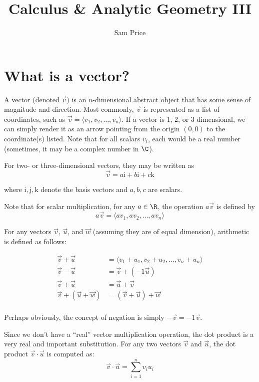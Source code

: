 \documentclass{article}
\title{Calculus \& Analytic Geometry III}
\author{Sam Price}
\begin{document}
\maketitle

\section{What is a vector?}
A vector (denoted $\vec{v}$) is an $n$-dimensional abstract object that has some sense of magnitude and direction.
Most commonly, $\vec{v}$ is represented as a list of coordinates, such as $\vec{v} = \langle v_{1}, v_{2}, \ldots, v_{n} \rangle$.
If a vector is 1, 2, or 3 dimensional, we can simply render it as an arrow pointing from the origin $(0, 0)$ to the coordinate(s) listed.
Note that for all scalars $v_{i}$, each would be a real number (sometimes, it may be a complex number in $\C$).

For two- or three-dimensional vectors, they may be written as
\begin{equation}
  \vec{v} = a\bm{\mathrm{i}} + b\bm{\mathrm{i}} + c\bm{\mathrm{k}}
\end{equation}

where $\bm{\mathrm{i}}, \bm{\mathrm{j}}, \bm{\mathrm{k}}$ denote the basis vectors
and $a, b, c$ are scalars.


Note that for scalar multiplication, for any $a \in \R$,
the operation $a\vec{v}$ is defined by
\begin{equation*}
  a\vec{v} = \langle av_{1}, av_{2}, \ldots, av_{n} \rangle
\end{equation*}

For any vectors $\vec{v}$, $\vec{u}$, and $\vec{w}$ (assuming they are of equal dimension), arithmetic is defined as follows:

\begin{align*}
  \vec{v} + \vec{u} &= \langle v_{1}+u_{1}, v_{2}+u_{2}, \ldots , v_{n}+u_{n} \rangle\\
  \vec{v} - \vec{u} &= \vec{v} + (-1 \vec{u})\\
  \vec{v} + \vec{u} &= \vec{u} + \vec{v}\\
  \vec{v} + (\vec{u} + \vec{w}) &= (\vec{v} + \vec{u}) + \vec{w}\\
\end{align*}

Perhaps obviously, the concept of negation is simply $-\vec{v} = -1\vec{v}$.

Since we don't have a ``real'' vector multiplication operation,
the dot product is a very real and important substitution.
For any two vectors $\vec{v}$ and $\vec{u}$, the dot product
$\vec{v} \cdot \vec{u}$ is computed as:
\begin{equation}\label{dot-product-defn}
  \vec{v} \cdot \vec{u} = \sum_{i = 1}^{n}v_{i}u_{i}
\end{equation}
\end{document}
